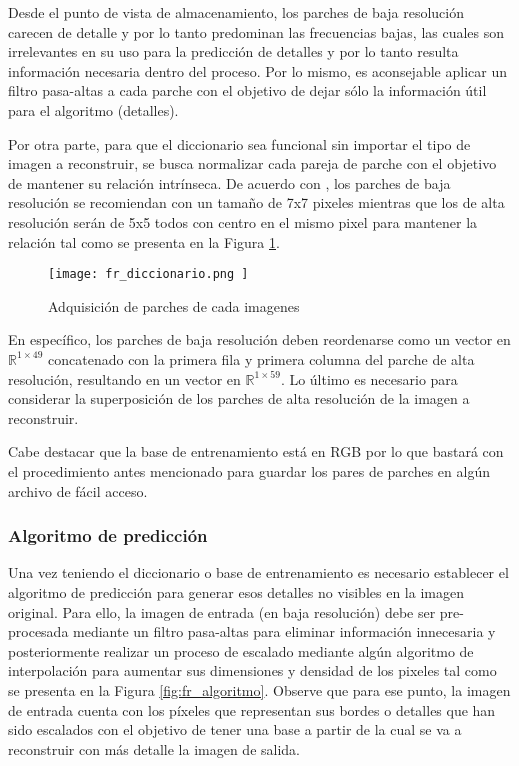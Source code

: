 Desde el punto de vista de almacenamiento, los parches de baja resolución carecen 
de detalle y por lo tanto predominan las frecuencias bajas, las cuales son 
irrelevantes en su uso para la predicción de detalles y por lo tanto resulta
información necesaria dentro del proceso. Por lo mismo, es aconsejable aplicar un filtro pasa-altas a cada parche 
con el objetivo de dejar sólo la información útil para el algoritmo (detalles).

Por otra parte, para que el diccionario sea funcional sin importar el 
tipo de imagen a reconstruir, se busca normalizar cada pareja de parche con el 
objetivo de mantener su relación intrínseca. De acuerdo con \cite{freeman}, 
los parches de baja resolución se recomiendan con un tamaño de 7x7 pixeles
mientras que los de alta resolución serán de 5x5 todos con centro en el mismo pixel
para mantener la relación tal como se presenta en la Figura \ref{fig:fr_dic}.

\begin{figure}[H]
    \texttt{[image:  fr\_diccionario.png ]}
    \centering
    \caption{ Adquisición de parches de cada imagenes}
    \label{fig:fr_dic}
\end{figure}

En específico, los parches de baja resolución deben reordenarse como un vector 
en $\mathbb{R}^{1\times49}$ concatenado con la primera fila y primera columna
del parche de alta resolución, resultando en un vector en $\mathbb{R}^{1\times59}$.
Lo último es necesario para considerar la superposición
de los parches de alta resolución de la imagen a reconstruir. 

Cabe destacar que la base de entrenamiento está en 
RGB por lo que bastará con el procedimiento antes mencionado para guardar
los pares de parches en algún archivo de fácil acceso. 

\subsubsection{Algoritmo de predicción}
\noindent
Una vez teniendo el diccionario o base de entrenamiento es necesario establecer el algoritmo de 
predicción para generar esos detalles no visibles en la imagen original.
Para ello, la imagen de entrada (en baja resolución) debe ser pre-procesada
mediante un filtro pasa-altas para eliminar información innecesaria y posteriormente realizar
un proceso de escalado mediante algún algoritmo de interpolación para
aumentar sus dimensiones y densidad de los pixeles tal como se presenta
en la Figura \ref{fig:fr_algoritmo}. Observe que para ese punto, la imagen de entrada
cuenta con los píxeles que representan sus bordes o detalles que han sido
escalados con el objetivo de tener una base a partir de la cual se va a reconstruir
con más detalle la imagen de salida.  

